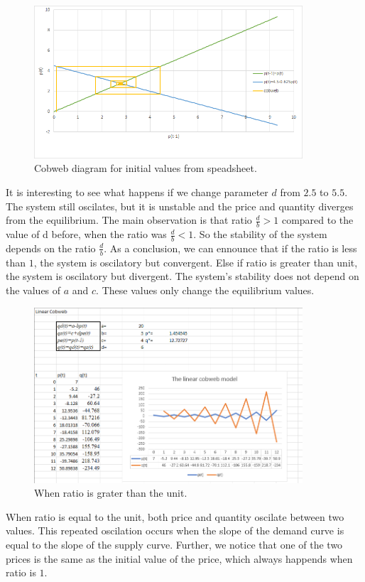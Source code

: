\documentclass[a4paper,11pt]{report}
\begin{document}
\begin{figure}[h]
\caption{Cobweb diagram for initial values from speadsheet.}
\centering
 \includegraphics[width=10cm]{cobwebdiagramfirstexample.png}
\end{figure}
It is interesting to see what happens if we change parameter $d$ from $2.5$ to $5.5$. The system still oscilates, but it is unstable and the price and quantity diverges from the equilibrium. The main observation is that ratio $\frac{d}{b}>1$ compared to the value of d before, when the ratio was $\frac{d}{b}<1$. So the stability of the system depends on the ratio $\frac{d}{b}$. As a conclusion, we can ennounce that if the ratio is less than $1$, the system is oscilatory but convergent. Else if ratio is greater than unit, the system is oscilatory but divergent. The system's stability does not depend on the values of $a$ and $c$. These values only change the equilibrium values.
\begin{figure}[h]
\caption{When ratio is grater than the unit.}
\centering
 \includegraphics[width=10cm]{cobwebratioabove1.PNG}
\end{figure}
When ratio is equal to the unit, both price and quantity oscilate between two values. This repeated oscilation occurs when the slope of the demand curve is equal to the slope of the supply curve. Further, we notice that one of the two prices is the same as the initial value of the price, which always happends when ratio is $1$.
\end{document}

